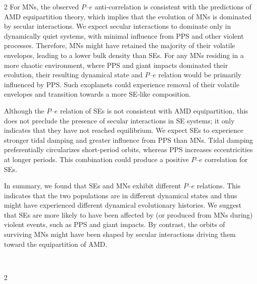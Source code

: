 \documentclass[10pt]{article}
\begin{document}
\begin{multicols}{2}
For MNs, the observed $P$--$e$ anti-correlation is consistent with the predictions of AMD equipartition theory, which implies that the evolution of MNs is dominated by secular interactions.
We expect secular interactions to dominate only in dynamically quiet systems, with minimal influence from PPS and other violent processes.
Therefore, MNs might have retained the majority of their volatile envelopes, leading to a lower bulk density than SEs.
For any MNs residing in a more chaotic environment, where PPS and giant impacts dominated their evolution, their resulting dynamical state and $P$--$e$ relation would be primarily influenced by PPS.
Such exoplanets could experience removal of their volatile envelopes and transition towards a more SE-like composition\cite{2015ApJ...812..164L,2015Icar..247...81S,2024ApJ...967...38Z}.

Although the $P$--$e$ relation of SEs is not consistent with AMD equipartition, this does not preclude the presence of secular interactions in SE systems; it only indicates that they have not reached equilibrium.
We expect SEs to experience stronger tidal damping and greater influence from PPS than MNs.
Tidal damping preferentially circularizes short-period orbits, whereas PPS increases eccentricities at longer periods.
This combination could produce a positive $P$--$e$ correlation for SEs.

In summary, we found that SEs and MNs exhibit different $P$--$e$ relations.
This indicates that the two populations are in different dynamical states and thus might have experienced different dynamical evolutionary histories.
We suggest that SEs are more likely to have been affected by (or produced from MNs during) violent events, such as PPS and giant impacts.
By contrast, the orbits of surviving MNs might have been shaped by secular interactions driving them toward the equipartition of AMD.
\end{multicols}
~\\
\begin{multicols}{2}






























\end{multicols}
~\\
\end{document}
